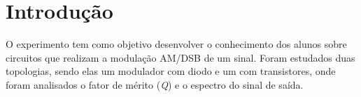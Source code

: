 \newpage

\section{Introdução}
O experimento tem como objetivo desenvolver o conhecimento dos alunos sobre circuitos que realizam a modulação AM/DSB de um sinal. Foram estudados duas topologias, sendo elas um modulador com diodo e um com transistores, onde foram analisados o fator de mérito (\textit{Q}) e o espectro do sinal de saída.
